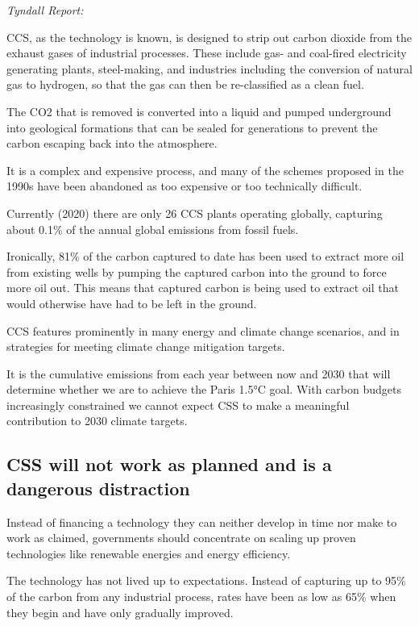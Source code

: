 \documentclass[
]{book}
\begin{document}
\emph{Tyndall Report:}

CCS, as the technology is known, is designed to
strip out carbon dioxide from the exhaust gases of industrial processes.
These include gas- and coal-fired electricity generating plants, steel-making,
and industries including the conversion of natural gas to hydrogen,
so that the gas can then be re-classified as a clean fuel.

The CO2 that is removed is converted into a liquid and pumped underground
into geological formations that can be sealed for generations
to prevent the carbon escaping back into the atmosphere.

It is a complex and expensive process, and many of the schemes proposed in the 1990s
have been abandoned as too expensive or too technically difficult.

Currently (2020) there are only 26 CCS plants operating globally,
capturing about 0.1\% of the annual global emissions from fossil fuels.

Ironically, 81\% of the carbon captured to date has been used to
extract more oil from existing wells by pumping the captured carbon into the ground
to force more oil out.
This means that captured carbon is being used to extract oil that
would otherwise have had to be left in the ground.

CCS features prominently in many energy and climate change scenarios,
and in strategies for meeting climate change mitigation targets.

It is the cumulative emissions from each year between now and 2030 that will
determine whether we are to achieve the Paris 1.5°C goal.
With carbon budgets increasingly constrained we cannot expect
CSS to make a meaningful contribution to 2030 climate targets.

\hypertarget{css-will-not-work-as-planned-and-is-a-dangerous-distraction}{%
\subsection{CSS will not work as planned and is a dangerous distraction}\label{css-will-not-work-as-planned-and-is-a-dangerous-distraction}}

Instead of financing a technology they can neither develop in time
nor make to work as claimed,
governments should concentrate on scaling up proven technologies
like renewable energies and energy efficiency.

The technology has not lived up to expectations.
Instead of capturing up to 95\% of the carbon from any industrial process,
rates have been as low as 65\% when they begin and have only gradually improved.
\end{document}
